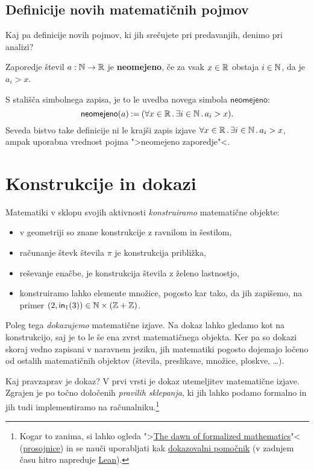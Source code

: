 \subsection{Definicije novih matematičnih pojmov}

Kaj pa definicije novih pojmov, ki jih srečujete pri predavanjih, denimo pri analizi?

\begin{definicija}
  Zaporedje števil $a : \mathbb{N} \to \mathbb{R}$ je \textbf{neomejeno}, če za vsak $x \in \mathbb{R}$ obstaja $i \in \mathbb{N}$, da je $a_i > x$.
\end{definicija}

\noindent
S stališča simbolnega zapisa, je to le uvedba novega simbola $\mathsf{neomejeno}$:
%
\begin{equation*}
  \mathsf{neomejeno}(a) \mathbin{{:}{=}} (\forall x \in \mathbb{R} \,.\, \exists i \in \mathbb{N} \,.\, a_i > x).
\end{equation*}
%
Seveda bistvo take definicije ni le krajši zapis izjave $\forall x \in \mathbb{R} \,.\, \exists i \in \mathbb{N} \,.\, a_i > x$, ampak uporabna vrednost pojma ">neomejeno zaporedje"<.


\section{Konstrukcije in dokazi}

Matematiki v sklopu svojih aktivnosti \emph{konstruiramo} matematične objekte:
%
\begin{itemize}
\item v geometriji so znane konstrukcije z ravnilom in šestilom,
\item računanje števk števila $\pi$ je konstrukcija približka,
\item reševanje enačbe, je konstrukcija števila z želeno lastnostjo,
\item konstruiramo lahko elemente množice, pogosto kar tako, da jih zapišemo, na primer $(2, \mathsf{in}_{1}(3)) \in \mathbb{N} \times (\mathbb{Z} + \mathbb{Z})$.
\end{itemize}

Poleg tega \emph{dokazujemo} matematične izjave. Na dokaz lahko gledamo kot na konstrukcijo, saj je to le še ena zvrst matematičnega objekta. Ker pa so dokazi skoraj vedno zapisani v naravnem jeziku, jih matematiki pogosto dojemajo ločeno od ostalih matematičnih objektov (števila, preslikave, množice, ploskve, \dots).

Kaj pravzaprav je dokaz? V prvi vrsti je dokaz utemeljitev matematične izjave. Zgrajen je po točno določenih \emph{pravilih sklepanja}, ki jih lahko podamo formalno in jih tudi implementiramo na računalniku.\footnote{Kogar to zanima, si lahko ogleda ">\href{https://youtu.be/Z500sma3h90}{The dawn of formalized mathematics}"< (\href{https://www.icloud.com/keynote/0Gkr1yM7XY-31aQleWf-fiW7A}{prosojnice}) in se nauči uporabljati kak  \href{https://ncatlab.org/nlab/show/proof+assistant}{dokazovalni pomočnik} (v zadnjem času hitro napreduje \href{https://leanprover.github.io}{Lean}).
}

